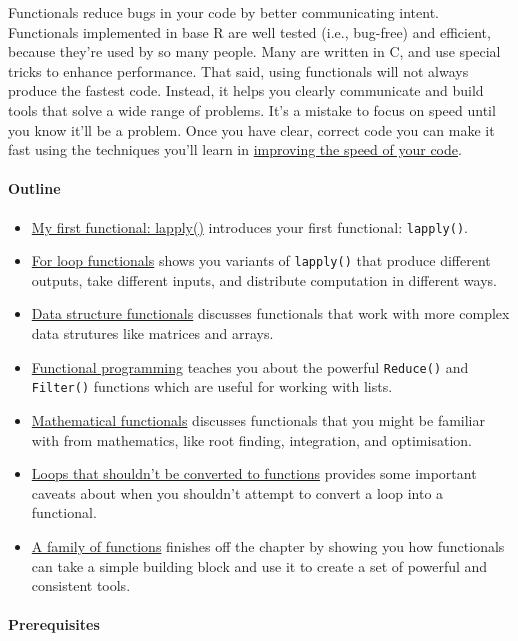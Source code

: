 Functionals reduce bugs in your code by better communicating intent.
Functionals implemented in base R are well tested (i.e., bug-free) and
efficient, because they're used by so many people. Many are written in
C, and use special tricks to enhance performance. That said, using
functionals will not always produce the fastest code. Instead, it helps
you clearly communicate and build tools that solve a wide range of
problems. It's a mistake to focus on speed until you know it'll be a
problem. Once you have clear, correct code you can make it fast using
the techniques you'll learn in \hyperref[profiling]{improving the speed
of your code}.

\paragraph{Outline}

\begin{itemize}
\item
  \hyperref[lapply]{My first functional: lapply()} introduces your first
  functional: \texttt{lapply()}.
\item
  \hyperref[functionals-loop]{For loop functionals} shows you variants
  of \texttt{lapply()} that produce different outputs, take different
  inputs, and distribute computation in different ways.
\item
  \hyperref[functionals-ds]{Data structure functionals} discusses
  functionals that work with more complex data strutures like matrices
  and arrays.
\item
  \hyperref[functionals-fp]{Functional programming} teaches you about
  the powerful \texttt{Reduce()} and \texttt{Filter()} functions which
  are useful for working with lists.
\item
  \hyperref[functionals-math]{Mathematical functionals} discusses
  functionals that you might be familiar with from mathematics, like
  root finding, integration, and optimisation.
\item
  \hyperref[functionals-not]{Loops that shouldn't be converted to
  functions} provides some important caveats about when you shouldn't
  attempt to convert a loop into a functional.
\item
  \hyperref[function-family]{A family of functions} finishes off the
  chapter by showing you how functionals can take a simple building
  block and use it to create a set of powerful and consistent tools.
\end{itemize}

\paragraph{Prerequisites}

